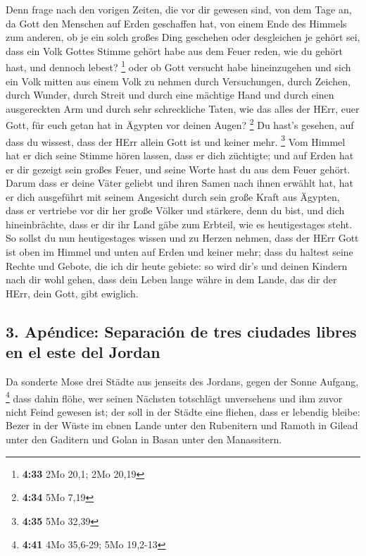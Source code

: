  Denn frage nach den vorigen Zeiten, die vor dir gewesen
sind, von dem Tage an, da Gott den Menschen auf Erden geschaffen hat,
von einem Ende des Himmels zum anderen, ob je ein solch großes Ding
geschehen oder desgleichen je gehört sei,  dass ein Volk
Gottes Stimme gehört habe aus dem Feuer reden, wie du gehört hast, und
dennoch lebest? \footnote{\textbf{4:33} 2Mo 20,1; 2Mo 20,19}
 oder ob Gott versucht habe hineinzugehen und sich ein
Volk mitten aus einem Volk zu nehmen durch Versuchungen, durch Zeichen,
durch Wunder, durch Streit und durch eine mächtige Hand und durch einen
ausgereckten Arm und durch sehr schreckliche Taten, wie das alles der
HErr, euer Gott, für euch getan hat in Ägypten vor deinen Augen?
\footnote{\textbf{4:34} 5Mo 7,19}  Du hast's gesehen, auf
dass du wissest, dass der HErr allein Gott ist und keiner mehr.
\footnote{\textbf{4:35} 5Mo 32,39}  Vom Himmel hat er
dich seine Stimme hören lassen, dass er dich züchtigte; und auf Erden
hat er dir gezeigt sein großes Feuer, und seine Worte hast du aus dem
Feuer gehört.  Darum dass er deine Väter geliebt und
ihren Samen nach ihnen erwählt hat, hat er dich ausgeführt mit seinem
Angesicht durch sein große Kraft aus Ägypten,  dass er
vertriebe vor dir her große Völker und stärkere, denn du bist, und dich
hineinbrächte, dass er dir ihr Land gäbe zum Erbteil, wie es
heutigestages steht.  So sollst du nun heutigestages
wissen und zu Herzen nehmen, dass der HErr Gott ist oben im Himmel und
unten auf Erden und keiner mehr;  dass du haltest seine
Rechte und Gebote, die ich dir heute gebiete: so wird dir's und deinen
Kindern nach dir wohl gehen, dass dein Leben lange währe in dem Lande,
das dir der HErr, dein Gott, gibt ewiglich.

\hypertarget{apuxe9ndice-separaciuxf3n-de-tres-ciudades-libres-en-el-este-del-jordan}{%
\subsection{3. Apéndice: Separación de tres ciudades libres en el este
del
Jordan}\label{apuxe9ndice-separaciuxf3n-de-tres-ciudades-libres-en-el-este-del-jordan}}

 Da sonderte Mose drei Städte aus jenseits des Jordans,
gegen der Sonne Aufgang, \footnote{\textbf{4:41} 4Mo 35,6-29; 5Mo
  19,2-13}  dass dahin flöhe, wer seinen Nächsten
totschlägt unversehens und ihm zuvor nicht Feind gewesen ist; der soll
in der Städte eine fliehen, dass er lebendig bleibe: 
Bezer in der Wüste im ebnen Lande unter den Rubenitern und Ramoth in
Gilead unter den Gaditern und Golan in Basan unter den Manassitern.

